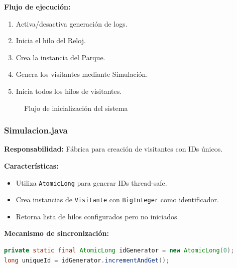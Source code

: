 \documentclass[12pt,a4paper]{article}
\begin{document}
\textbf{Flujo de ejecución:}
\begin{enumerate}
    \item Activa/desactiva generación de logs.
    \item Inicia el hilo del Reloj.
    \item Crea la instancia del Parque.
    \item Genera los visitantes mediante Simulación.
    \item Inicia todos los hilos de visitantes.
\end{enumerate}

\begin{figure}[H]
\centering
{}
\caption{Flujo de inicialización del sistema}
\end{figure}

\subsubsection{Simulacion.java}

\textbf{Responsabilidad:} Fábrica para creación de visitantes con IDs únicos.

\textbf{Características:}
\begin{itemize}
    \item Utiliza \texttt{AtomicLong} para generar IDs thread-safe.
    \item Crea instancias de \texttt{Visitante} con \texttt{BigInteger} como identificador.
    \item Retorna lista de hilos configurados pero no iniciados.
\end{itemize}

\textbf{Mecanismo de sincronización:}
\begin{lstlisting}[language=Java]
private static final AtomicLong idGenerator = new AtomicLong(0);
long uniqueId = idGenerator.incrementAndGet();
\end{lstlisting}
\newpage
\end{document}
